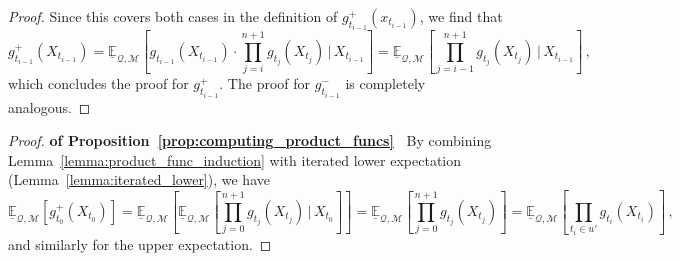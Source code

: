 \documentclass[twoside,11pt]{article}
\newcommand{\lexp}{\underline{\mathbb{E}}_{\rateset,\mathcal{M}}}
\newcommand{\rateset}{\mathcal{Q}}
\begin{document}
\begin{proof}
Since this covers both cases in the definition of $g_{t_{i-1}}^+(x_{t_{i-1}})$, we find that
\begin{equation*}
g_{t_{i-1}}^+(X_{t_{i-1}}) = \lexp\left[g_{t_{i-1}}(X_{t_{i-1}})\cdot\prod_{j=i}^{n+1}g_{t_j}(X_{t_j})\,\vert\,X_{t_{i-1}}\right] = \lexp\left[\prod_{j={i-1}}^{n+1}g_{t_j}(X_{t_j})\,\vert\,X_{t_{i-1}}\right]\,,
\end{equation*}
which concludes the proof for $g_{t_{i-1}}^+$. The proof for $g_{t_{i-1}}^-$ is completely analogous.
\end{proof}

\begin{proof}{\bf of Proposition~\ref{prop:computing_product_funcs}~}
By combining Lemma~\ref{lemma:product_func_induction} with iterated lower expectation (Lemma~\ref{lemma:iterated_lower}), we have
\begin{equation*}
\lexp\left[g_{t_0}^+(X_{t_0})\right] = \lexp\left[\lexp\left[\prod_{j=0}^{n+1}g_{t_j}(X_{t_j})\,\vert\,X_{t_0}\right]\right] = \lexp\left[\prod_{j=0}^{n+1}g_{t_j}(X_{t_j})\right] = \lexp\left[\prod_{t_i\in u'}g_{t_i}(X_{t_i})\right]\,,
\end{equation*}
and similarly for the upper expectation.
\end{proof}
\end{document}

